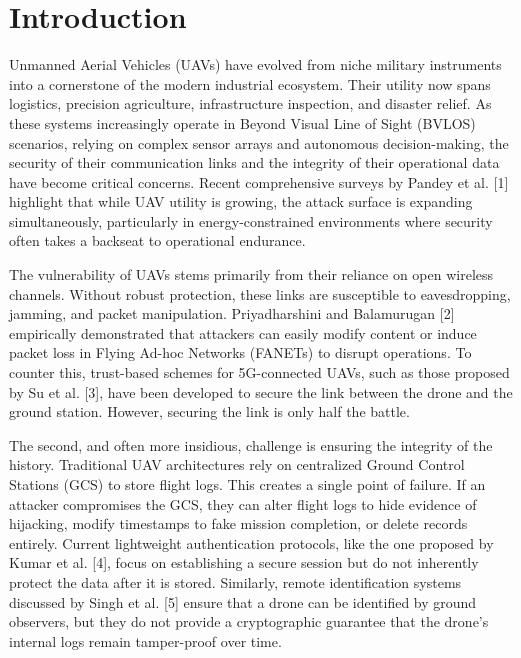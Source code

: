 \documentclass[preprint,12pt]{elsarticle}
\begin{document}


\section{Introduction}
\label{sec1}

Unmanned Aerial Vehicles (UAVs) have evolved from niche military instruments into a cornerstone of the modern industrial ecosystem. Their utility now spans logistics, precision agriculture, infrastructure inspection, and disaster relief. As these systems increasingly operate in Beyond Visual Line of Sight (BVLOS) scenarios, relying on complex sensor arrays and autonomous decision-making, the security of their communication links and the integrity of their operational data have become critical concerns. Recent comprehensive surveys by Pandey et al. [1] highlight that while UAV utility is growing, the attack surface is expanding simultaneously, particularly in energy-constrained environments where security often takes a backseat to operational endurance.

The vulnerability of UAVs stems primarily from their reliance on open wireless channels. Without robust protection, these links are susceptible to eavesdropping, jamming, and packet manipulation. Priyadharshini and Balamurugan [2] empirically demonstrated that attackers can easily modify content or induce packet loss in Flying Ad-hoc Networks (FANETs) to disrupt operations. To counter this, trust-based schemes for 5G-connected UAVs, such as those proposed by Su et al. [3], have been developed to secure the link between the drone and the ground station. However, securing the link is only half the battle.


The second, and often more insidious, challenge is ensuring the integrity of the history. Traditional UAV architectures rely on centralized Ground Control Stations (GCS) to store flight logs. This creates a single point of failure. If an attacker compromises the GCS, they can alter flight logs to hide evidence of hijacking, modify timestamps to fake mission completion, or delete records entirely. Current lightweight authentication protocols, like the one proposed by Kumar et al. [4], focus on establishing a secure session but do not inherently protect the data after it is stored. Similarly, remote identification systems discussed by Singh et al. [5] ensure that a drone can be identified by ground observers, but they do not provide a cryptographic guarantee that the drone's internal logs remain tamper-proof over time.
\end{document}
